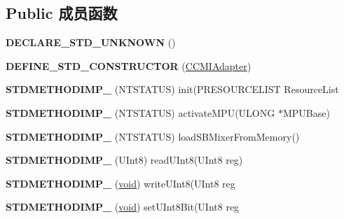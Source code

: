 \subsection*{Public 成员函数}
\begin{DoxyCompactItemize}
\item 
\mbox{\label{class_c_c_m_i_adapter_aa76713408b690df50bd4878731a15a29}} 
{\bfseries D\+E\+C\+L\+A\+R\+E\+\_\+\+S\+T\+D\+\_\+\+U\+N\+K\+N\+O\+WN} ()
\item 
\mbox{\label{class_c_c_m_i_adapter_a78f49aebbe144402c88f68fcd89e7e2c}} 
{\bfseries D\+E\+F\+I\+N\+E\+\_\+\+S\+T\+D\+\_\+\+C\+O\+N\+S\+T\+R\+U\+C\+T\+OR} (\hyperlink{class_c_c_m_i_adapter}{C\+C\+M\+I\+Adapter})
\item 
\mbox{\label{class_c_c_m_i_adapter_a5f94c6e4fd8cd9e9223844eb829ef20e}} 
{\bfseries S\+T\+D\+M\+E\+T\+H\+O\+D\+I\+M\+P\+\_\+} (N\+T\+S\+T\+A\+T\+US) init(P\+R\+E\+S\+O\+U\+R\+C\+E\+L\+I\+ST Resource\+List
\item 
\mbox{\label{class_c_c_m_i_adapter_a9349a48e5cd2ae4957efd65855fd245b}} 
{\bfseries S\+T\+D\+M\+E\+T\+H\+O\+D\+I\+M\+P\+\_\+} (N\+T\+S\+T\+A\+T\+US) activate\+M\+PU(U\+L\+O\+NG $\ast$M\+P\+U\+Base)
\item 
\mbox{\label{class_c_c_m_i_adapter_a80b87179a55ae816fe2a2db32542ce6f}} 
{\bfseries S\+T\+D\+M\+E\+T\+H\+O\+D\+I\+M\+P\+\_\+} (N\+T\+S\+T\+A\+T\+US) load\+S\+B\+Mixer\+From\+Memory()
\item 
\mbox{\label{class_c_c_m_i_adapter_abab1c7a9a4bb5172b9b95e46a25e261e}} 
{\bfseries S\+T\+D\+M\+E\+T\+H\+O\+D\+I\+M\+P\+\_\+} (U\+Int8) read\+U\+Int8(U\+Int8 reg)
\item 
\mbox{\label{class_c_c_m_i_adapter_ac35465dc76e4580a436b2e415b727b25}} 
{\bfseries S\+T\+D\+M\+E\+T\+H\+O\+D\+I\+M\+P\+\_\+} (\hyperlink{interfacevoid}{void}) write\+U\+Int8(U\+Int8 reg
\item 
\mbox{\label{class_c_c_m_i_adapter_a1b0c5da1ec28aeb6d57f55cb93a1a88a}} 
{\bfseries S\+T\+D\+M\+E\+T\+H\+O\+D\+I\+M\+P\+\_\+} (\hyperlink{interfacevoid}{void}) set\+U\+Int8\+Bit(U\+Int8 reg

\end{DoxyCompactItemize}
